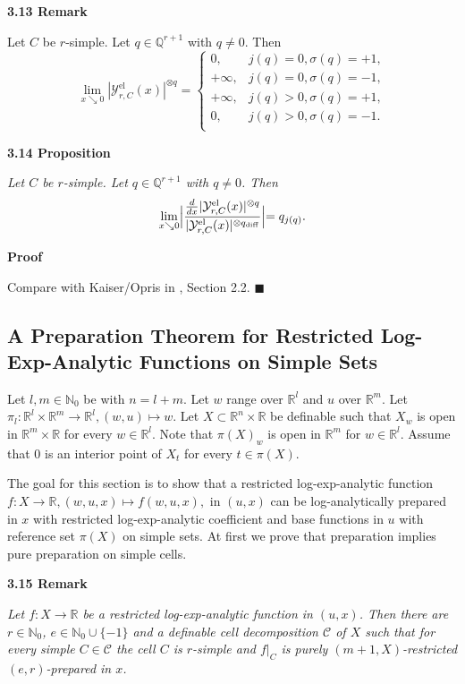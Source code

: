 \documentclass[12pt]{article}
\def\vs{\vspace}
\def\IQ{\mathbb Q}
\def\ma{\mathcal}
\begin{document}
\vs{0.5cm}
{\bf3.13 Remark}

\vs{0.1cm}
Let $C$ be $r$-simple. Let 
$q\in \IQ^{r+1}$ with $q\neq 0$.
Then
$$\lim_{x\searrow 0}|\ma{Y}_{r,C}^\mathrm{el}(x)|^{\otimes q}=
\left\{\begin{array}{cc}
0,&j(q)=0,\sigma(q)=+1,\\
+\infty,&j(q)=0,\sigma(q)=-1,\\
+\infty,&j(q)>0,\sigma(q)=+1,\\
0,&j(q)>0,\sigma(q)=-1.\\
\end{array}\right.$$

\vs{0.5cm}
{\bf3.14 Proposition}

\vs{0.1cm}
{\it Let $C$ be $r$-simple. Let $q\in \IQ^{r+1}$ with $q\neq 0$. Then
	$$\lim_{x \searrow 0} \Bigl|\frac{\frac{d}{dx}|\ma{Y}_{r,C}^\mathrm{el}(x)|^{\otimes q}}
	{|\ma{Y}_{r,C}^\mathrm{el}(x)|^{\otimes q_\mathrm{diff}}} \Bigl|=q_{j(q)}.$$}

\vs{0.1cm}
{\bf Proof}

\vs{0.1cm}
Compare with Kaiser/Opris in \cite{7}, Section 2.2. \hfill$\blacksquare$

\subsection{A Preparation Theorem for Restricted Log-Exp-Analytic Functions on Simple Sets}
Let $l,m \in \mathbb{N}_0$ be with $n=l+m$. Let $w$ range over $\mathbb{R}^l$ and $u$ over $\mathbb{R}^m$. Let $\pi_l:\mathbb{R}^l \times \mathbb{R}^m \to \mathbb{R}^l ,(w,u) \mapsto w$. Let $X \subset \mathbb{R}^n \times \mathbb{R}$ be definable such that $X_w$ is open in $\mathbb{R}^m \times \mathbb{R}$ for every $w \in \mathbb{R}^l$. Note that $\pi(X)_w$ is open in $\mathbb{R}^m$ for $w \in \mathbb{R}^l$. Assume that $0$ is an interior point of $X_t$ for every $t \in \pi(X)$. 


\vs{0.3cm}
The goal for this section is to show that a restricted log-exp-analytic function $f:X \to \mathbb{R}, (w,u,x) \mapsto f(w,u,x),$ in $(u,x)$ can be log-analytically prepared in $x$ with restricted log-exp-analytic coefficient and base functions in $u$ with reference set $\pi(X)$ on simple sets. At first we prove that preparation implies pure preparation on simple cells.

\vs{0.5cm}
{\bf3.15 Remark}

\vs{0.1cm}
{\it 
Let $f:X \to \mathbb{R}$ be a restricted log-exp-analytic function in $(u,x)$. Then there are $r \in \mathbb{N}_0$, $e \in \mathbb{N}_0 \cup \{-1\}$ and a definable cell decomposition $\mathcal{C}$ of $X$ such that for every simple $C \in \mathcal{C}$ the cell $C$ is $r$-simple and $f|_C$ is purely $(m+1,X)$-restricted $(e,r)$-prepared in $x$.}
\end{document}

